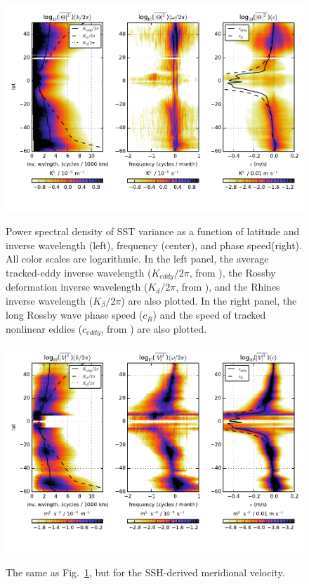 \documentclass[10pt]{article}
\begin{document}
\begin{figure}[t]
  \noindent\includegraphics{../figures/SAT_50degwide/integrated_spectra_T.pdf}\\
  \caption{Power spectral density of SST variance as a function of latitude and inverse wavelength (left), frequency (center), and phase speed(right). All color scales are logarithmic. In the left panel, the average tracked-eddy inverse wavelength ($K_{eddy}/2\pi$, from \citealt{CheltonEtAl2011}), the Rossby deformation inverse wavelength ($K_d/2\pi$, from \citealt{TullochEtAl2011}), and the Rhines inverse wavelength ($K_{\beta} / 2\pi$) are also plotted. In the right panel, the long Rossby wave phase speed ($c_R$) and the speed of tracked nonlinear eddies ($c_{eddy}$, from \citealt{CheltonEtAl2011}) are also plotted.}
  \label{fig:integrated_spectra_T}
\end{figure}

\begin{figure}[t]
  \noindent\includegraphics{../figures/SAT_50degwide/integrated_spectra_V.pdf}\\
  \caption{The same as Fig.~\ref{fig:integrated_spectra_T}, but for the SSH-derived meridional velocity.}
  \label{fig:integrated_spectra_V}
\end{figure}
\end{document}
